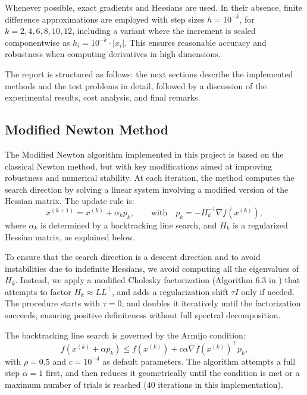 \documentclass[a4paper,12pt]{article}
\begin{document}
	Whenever possible, exact gradients and Hessians are used. In their absence, finite difference approximations are employed with step sizes \( h = 10^{-k} \), for \( k = 2, 4, 6, 8, 10, 12 \), including a variant where the increment is scaled componentwise as \( h_i = 10^{-k} \cdot |x_i| \). This ensures reasonable accuracy and robustness when computing derivatives in high dimensions.
	
	\vspace{0.5em}
	The report is structured as follows: the next sections describe the implemented methods and the test problems in detail, followed by a discussion of the experimental results, cost analysis, and final remarks.
	
	\newpage
	\subsection{Modified Newton Method}
	
	The Modified Newton algorithm implemented in this project is based on the classical Newton method, but with key modifications aimed at improving robustness and numerical stability. At each iteration, the method computes the search direction by solving a linear system involving a modified version of the Hessian matrix. The update rule is:
	\[
	x^{(k+1)} = x^{(k)} + \alpha_k p_k, \qquad \text{with} \quad p_k = -H_k^{-1} \nabla f(x^{(k)}),
	\]
	where \( \alpha_k \) is determined by a backtracking line search, and \( H_k \) is a regularized Hessian matrix, as explained below.
	
	To ensure that the search direction is a descent direction and to avoid instabilities due to indefinite Hessians, we avoid computing all the eigenvalues of \( H_k \). Instead, we apply a modified Cholesky factorization (Algorithm 6.3 in \cite{nocedal1999}) that attempts to factor \( H_k \approx LL^\top \), and adds a regularization shift \( \tau I \) only if needed. The procedure starts with \( \tau = 0 \), and doubles it iteratively until the factorization succeeds, ensuring positive definiteness without full spectral decomposition.
	
	The backtracking line search is governed by the Armijo condition:
	\[
	f(x^{(k)} + \alpha p_k) \leq f(x^{(k)}) + c \alpha \nabla f(x^{(k)})^\top p_k,
	\]
	with \( \rho = 0.5 \) and \( c = 10^{-4} \) as default parameters. The algorithm attempts a full step \( \alpha = 1 \) first, and then reduces it geometrically until the condition is met or a maximum number of trials is reached (40 iterations in this implementation).
	
\end{document}
